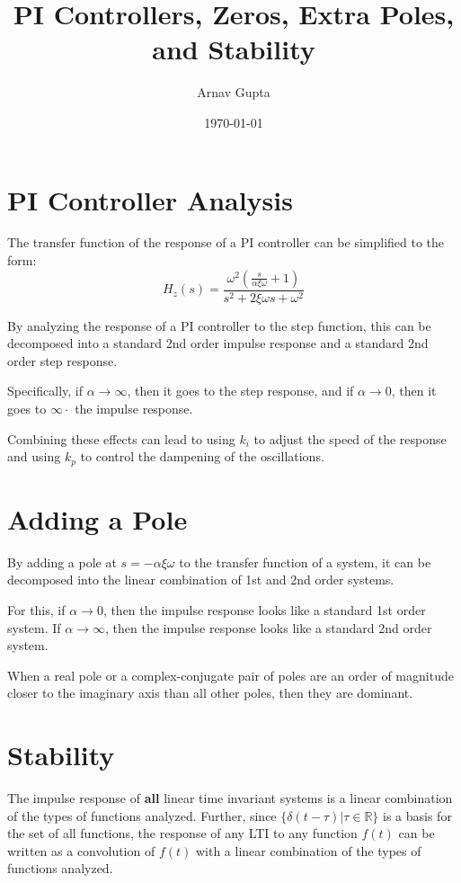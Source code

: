 \documentclass[11pt]{article}
\author{Arnav Gupta}
\date{\today}
\title{PI Controllers, Zeros, Extra Poles, and Stability}
\begin{document}
\maketitle
\tableofcontents

\section{PI Controller Analysis}
\label{sec:org9cdaeef}
The transfer function of the response of a PI controller can be simplified to the form:
$$
H_{z}(s) = \frac{\omega^{2} \left( \frac{s}{\alpha \xi \omega} + 1 \right)}
{s^{2} + 2 \xi \omega s + \omega^{2}}
$$

By analyzing the response of a PI controller to the step function, this can be decomposed
into a standard 2nd order impulse response and a standard 2nd order step response.

Specifically, if \(\alpha \to \infty\), then it goes to the step response, and if
\(\alpha \to 0\), then it goes to \(\infty \cdot\) the impulse response.

Combining these effects can lead to using \(k_{i}\) to adjust the speed of the response
and using \(k_{p}\) to control the dampening of the oscillations.
\section{Adding a Pole}
\label{sec:org10fb33a}
By adding a pole at \(s = -\alpha \xi \omega\) to the transfer function of a system,
it can be decomposed into the linear combination of 1st and 2nd order systems.

For this, if \(\alpha \to 0\), then the impulse response looks like a standard 1st
order system.
If \(\alpha \to \infty\), then the impulse response looks like a standard 2nd order
system.

When a real pole or a complex-conjugate pair of poles are an order of magnitude
closer to the imaginary axis than all other poles, then they are dominant.
\section{Stability}
\label{sec:org360b7c7}
The impulse response of \textbf{all} linear time invariant systems is a linear combination
of the types of functions analyzed.
Further, since \(\{\delta(t - \tau) | \tau \in \mathbb{R}\}\) is a basis for the
set of all functions, the response of any LTI to any function \(f(t)\) can be written
as a convolution of \(f(t)\) with a linear combination of the types of functions
analyzed.
\end{document}
